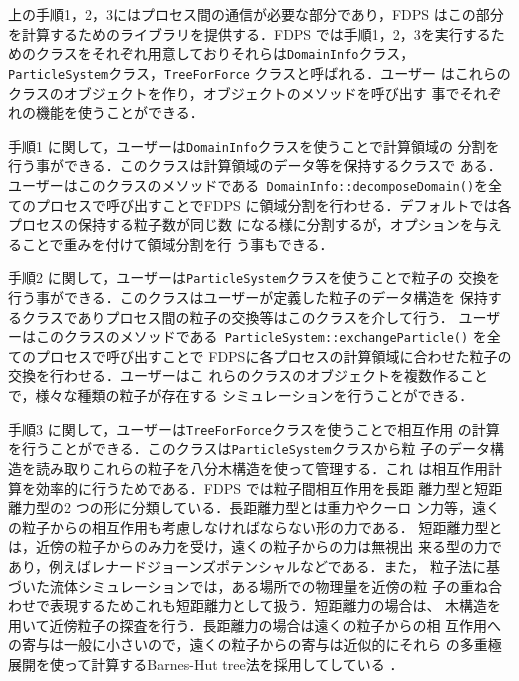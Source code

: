 \documentclass[submit,techreq,noauthor]{ipsj}
\begin{document}
上の手順1，2，3にはプロセス間の通信が必要な部分であり，FDPS はこの部分
を計算するためのライブラリを提供する．FDPS では手順1，2，3を実行するた
めのクラスをそれぞれ用意しておりそれらは{\tt DomainInfo}クラス，{\tt
  ParticleSystem}クラス，{\tt TreeForForce} クラスと呼ばれる．ユーザー
はこれらのクラスのオブジェクトを作り，オブジェクトのメソッドを呼び出す
事でそれぞれの機能を使うことができる．

手順1 に関して，ユーザーは{\tt DomainInfo}クラスを使うことで計算領域の
分割を行う事ができる．このクラスは計算領域のデータ等を保持するクラスで
ある．ユーザーはこのクラスのメソッドである{\tt
  DomainInfo::decomposeDomain()}を全てのプロセスで呼び出すことでFDPS
に領域分割を行わせる．デフォルトでは各プロセスの保持する粒子数が同じ数
になる様に分割するが，オプションを与えることで重みを付けて領域分割を行
う事もできる．

手順2 に関して，ユーザーは{\tt ParticleSystem}クラスを使うことで粒子の
交換を行う事ができる．このクラスはユーザーが定義した粒子のデータ構造を
保持するクラスでありプロセス間の粒子の交換等はこのクラスを介して行う．
ユーザーはこのクラスのメソッドである{\tt
  ParticleSystem::exchangeParticle()} を全てのプロセスで呼び出すことで
FDPSに各プロセスの計算領域に合わせた粒子の交換を行わせる．ユーザーはこ
れらのクラスのオブジェクトを複数作ることで，様々な種類の粒子が存在する
シミュレーションを行うことができる．

手順3 に関して，ユーザーは{\tt TreeForForce}クラスを使うことで相互作用
の計算を行うことができる．このクラスは{\tt ParticleSystem}クラスから粒
子のデータ構造を読み取りこれらの粒子を八分木構造を使って管理する．これ
は相互作用計算を効率的に行うためである．FDPS では粒子間相互作用を長距
離力型と短距離力型の2 つの形に分類している．長距離力型とは重力やクーロ
ン力等，遠くの粒子からの相互作用も考慮しなければならない形の力である．
短距離力型とは，近傍の粒子からのみ力を受け，遠くの粒子からの力は無視出
来る型の力であり，例えばレナードジョーンズポテンシャルなどである．また，
粒子法に基づいた流体シミュレーションでは，ある場所での物理量を近傍の粒
子の重ね合わせで表現するためこれも短距離力として扱う．短距離力の場合は、
木構造を用いて近傍粒子の探査を行う．長距離力の場合は遠くの粒子からの相
互作用への寄与は一般に小さいので，遠くの粒子からの寄与は近似的にそれら
の多重極展開を使って計算するBarnes-Hut tree法を採用してしている
\cite{1986Natur.324..446B}．

\end{document}
